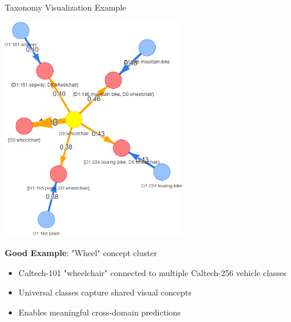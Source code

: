 \documentclass[aspectratio=169]{beamer}
\begin{document}
\begin{frame}{Taxonomy Visualization Example}
    \begin{center}
        \includegraphics[width=0.6\textwidth]{../thesis/figures/wheel_concept.png}
    \end{center}

    \textbf{Good Example}: "Wheel" concept cluster
    \begin{itemize}
        \item Caltech-101 "wheelchair" connected to multiple Caltech-256 vehicle classes
        \item Universal classes capture shared visual concepts
        \item Enables meaningful cross-domain predictions
    \end{itemize}
\end{frame}
\end{document}
